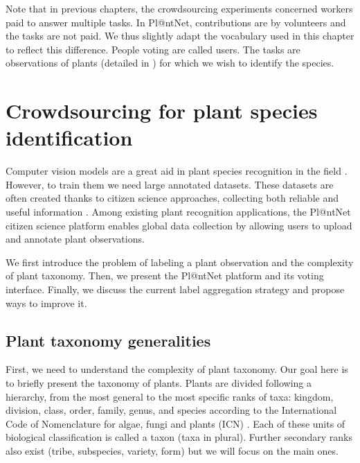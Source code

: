 Note that in previous chapters, the crowdsourcing experiments concerned workers paid to answer multiple tasks.
In Pl@ntNet, contributions are by volunteers and the tasks are not paid.
We thus slightly adapt the vocabulary used in this chapter to reflect this difference.
People voting are called users.
The tasks are observations of plants (detailed in ) for which we wish to identify the species.

\section{Crowdsourcing for plant species identification}
\label{sec:introducing_plantnet}

Computer vision models are a great aid in plant species recognition in the field \citep{vidal2021perspectives,borowiec2022}.
However, to train them we need large annotated datasets.
These datasets are often created thanks to citizen science approaches, collecting both reliable and useful information \citep{brown2019potential}.
Among existing plant recognition applications, the Pl@ntNet citizen science platform \citep{affouard2017pl} enables global data collection by allowing users to upload and annotate plant observations.

We first introduce the problem of labeling a plant observation and the complexity of plant taxonomy. Then, we present the Pl@ntNet platform and its voting interface.
Finally, we discuss the current label aggregation strategy and propose ways to improve it.

\subsection{Plant taxonomy generalities}
First, we need to understand the complexity of plant taxonomy.
Our goal here is to briefly present the taxonomy of plants.
Plants are divided following a hierarchy, from the most general to the most specific ranks of taxa: kingdom, division, class, order, family, genus, and species according to the International Code of Nomenclature for algae, fungi and plants (ICN) \citep{turland2018international}.
Each of these units of biological classification is called a taxon (taxa in plural).
Further secondary ranks also exist (tribe, subspecies, variety, form) but we will focus on the main ones.

